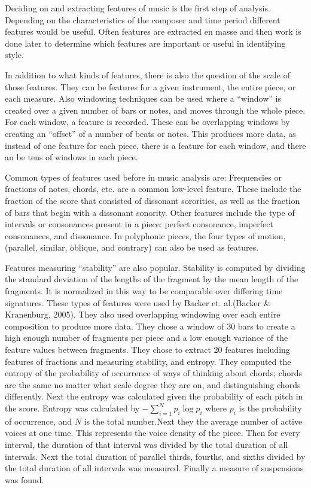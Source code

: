 \documentclass[12pt,twoside]{reedthesis}
\theoremstyle{definition}
\theoremstyle{definition}
\theoremstyle{definition}
\theoremstyle{remark}
\begin{document}
Deciding on and extracting features of music is the first step of
analysis. Depending on the characteristics of the composer and time
period different features would be useful. Often features are extracted
en masse and then work is done later to determine which features are
important or useful in identifying style.

In addition to what kinds of features, there is also the question of the
scale of those features. They can be features for a given instrument,
the entire piece, or each measure. Also windowing techniques can be used
where a ``window'' is created over a given number of bars or notes, and
moves through the whole piece. For each window, a feature is recorded.
These can be overlapping windows by creating an ``offset'' of a number
of beats or notes. This produces more data, as instead of one feature
for each piece, there is a feature for each window, and there an be tens
of windows in each piece.

Common types of features used before in music analysis are: Frequencies
or fractions of notes, chords, etc. are a common low-level feature.
These include the fraction of the score that consisted of dissonant
sororities, as well as the fraction of bars that begin with a dissonant
sonority. Other features include the type of intervals or consonances
present in a piece: perfect consonance, imperfect consonances, and
dissonance. In polyphonic pieces, the four types of motion, (parallel,
similar, oblique, and contrary) can also be used as features.

Features measuring ``stability'' are also popular. Stability is computed
by dividing the standard deviation of the lengths of the fragment by the
mean length of the fragments. It is normalized in this way to be
comparable over differing time signatures. These types of features were
used by Backer et. al.(Backer \& Kranenburg, 2005). They also used
overlapping windowing over each entire composition to produce more data.
They chose a window of 30 bars to create a high enough number of
fragments per piece and a low enough variance of the feature values
between fragments. They chose to extract 20 features including features
of fractions and measuring stability, and entropy. They computed the
entropy of the probability of occurrence of ways of thinking about
chords; chords are the same no matter what scale degree they are on, and
distinguishing chords differently. Next the entropy was calculated given
the probability of each pitch in the score. Entropy was calculated by
\(-\sum_{i = 1}^{N}p_i\log{p_i}\) where \(p_i\) is the probability of
occurrence, and \(N\) is the total number.Next they the average number
of active voices at one time. This represents the voice density of the
piece. Then for every interval, the duration of that interval was
divided by the total duration of all intervals. Next the total duration
of parallel thirds, fourths, and sixths divided by the total duration of
all intervals was measured. Finally a measure of suspensions was found.
\end{document}
